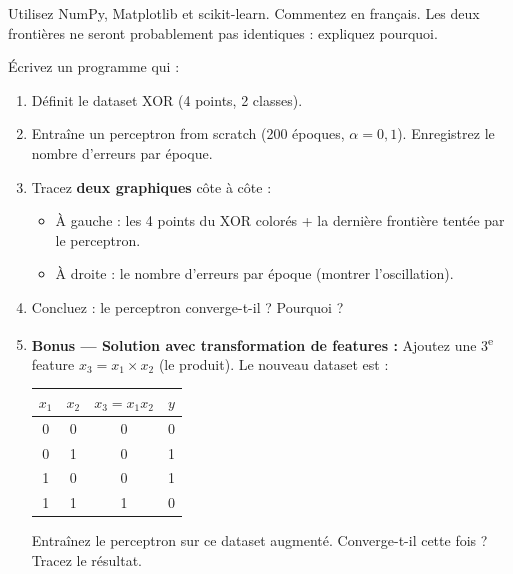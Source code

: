 \begin{attentionbox}[Consignes]
    Utilisez NumPy, Matplotlib et scikit-learn. Commentez en fran\c{c}ais.
    Les deux fronti\`{e}res ne seront probablement pas identiques : expliquez pourquoi.
\end{attentionbox}


\'{E}crivez un programme qui :

\begin{enumerate}[label=\alph*)]
    \item D\'{e}finit le dataset XOR (4 points, 2 classes).

    \item Entra\^{i}ne un perceptron from scratch (200 \'{e}poques, $\alpha = 0{,}1$).
        Enregistrez le nombre d'erreurs par \'{e}poque.

    \item Tracez \textbf{deux graphiques} c\^{o}te \`{a} c\^{o}te :
    \begin{itemize}
        \item \`{A} gauche : les 4 points du XOR color\'{e}s + la derni\`{e}re fronti\`{e}re
            tent\'{e}e par le perceptron.
        \item \`{A} droite : le nombre d'erreurs par \'{e}poque (montrer l'oscillation).
    \end{itemize}

    \item Concluez : le perceptron converge-t-il ? Pourquoi ?

    \item \textbf{Bonus --- Solution avec transformation de features :}
        Ajoutez une 3\textsuperscript{e} feature $x_3 = x_1 \times x_2$ (le produit).
        Le nouveau dataset est :

    \begin{center}
    \renewcommand{\arraystretch}{1.1}
    \begin{tabular}{ccc|c}
        \toprule
        $x_1$ & $x_2$ & $x_3 = x_1 x_2$ & $y$ \\
        \midrule
        0 & 0 & 0 & 0 \\
        0 & 1 & 0 & 1 \\
        1 & 0 & 0 & 1 \\
        1 & 1 & 1 & 0 \\
        \bottomrule
    \end{tabular}
    \end{center}

        Entra\^{i}nez le perceptron sur ce dataset augment\'{e}.
        Converge-t-il cette fois ? Tracez le r\'{e}sultat.
\end{enumerate}


